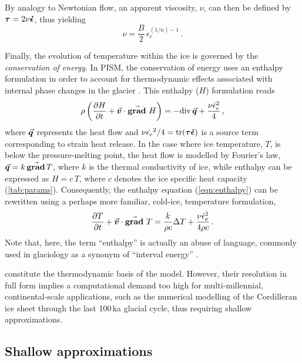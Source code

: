 \documentclass[a4paper]{kappa}
\newcommand{\vect}[1]{\va*{#1}} %
\newcommand{\tens}[1]{\vb*{#1}} %
\renewcommand{\div}[1]{\mathrm{div}\,#1}            %
\renewcommand{\grad}[1]{\vect{\mathrm{grad}}\,#1}   %
\newcommand{\matdv}[1]{\pdv{#1}{t}+\vect{v}\cdot\grad{}\,#1}  %
\newcommand{\doteps}[0]{\dot{\epsilon}} %
\newcommand{\DST}[0]{\tens{\tau}}       %
\newcommand{\SRT}[0]{\tens{\doteps}}    %
\begin{document}
By analogy to Newtonian flow, an apparent viscosity, $\nu$, can then be defined
by ${\DST = 2 \nu\SRT}$, thus yielding
\begin{equation}
    \label{eqn:viscosity}
    \nu = \frac{B}{2}\,\doteps_e^{(1/n)-1} \,.
\end{equation}

Finally, the evolution of temperature within the ice is governed by the
\emph{conservation of energy}. In PISM, the conservation of energy uses an
enthalpy formulation in order to
account for thermodynamic effects associated with internal phase changes in the
glacier \citep[Eqs.~20--21]{Aschwanden.etal.2012}. This enthalpy ($H$)
formulation reads
\begin{equation}
    \label{eqn:enthalpy}
    \rho \left(\matdv{H}\right)
        = -\div{\vect{q}} + \frac{\nu\doteps_e^2}{4} \,,
\end{equation}
where $\vect{q}$ represents the heat flow and
${\nu\dot{\epsilon_e}^2/4 = \tr(\DST\SRT)}$ is a
source term corresponding to strain heat release. In the case where ice
temperature, $T$, is below the pressure-melting point, the heat flow is
modelled by Fourier's law, $\vect{q} = k\,\grad{T}$, where $k$ is the thermal
conductivity of ice, while enthalpy can be expressed as $H=c\,T$, where $c$
denotes the ice specific heat capacity (\cref{tab:params}).
Consequently, the enthalpy equation (\ref{eqn:enthalpy}) can be rewritten using
a perhaps more familiar, cold-ice, temperature formulation,
\begin{equation}
    \label{eqn:temperature}
    \matdv{T} = \frac{k}{\rho c} \Delta T
                + \frac{\nu\doteps_e^2}{4\rho c} \,.
\end{equation}
Note that, here, the term ``enthalpy'' is actually an abuse of
language, commonly used in glaciology as a synonym of ``interval energy''
\citep{Aschwanden.etal.2012}.

constitute the thermodynamic basis
of the model. However, their resolution in full form implies a computational
demand too high for multi-millennial, continental-scale applications, such as
the numerical modelling of the Cordilleran ice sheet through the last 100\,ka
glacial cycle, thus requiring shallow approximations.


\subsection{Shallow approximations}
\label{sec:siassa}
\end{document}
